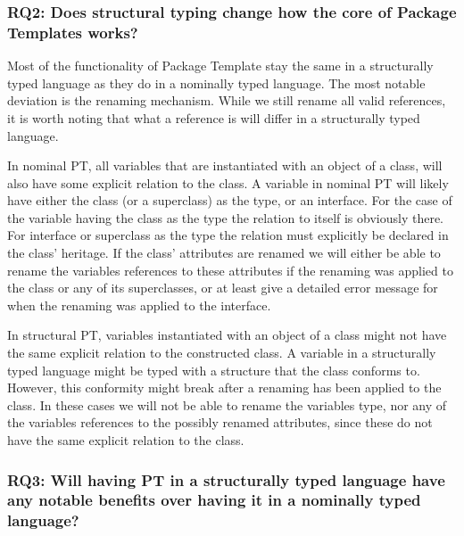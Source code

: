 \subsubsection{RQ2: Does structural typing change how the core of Package Templates works?}

Most of the functionality of Package Template stay the same in a structurally typed language as they do in a nominally typed language.
The most notable deviation is the renaming mechanism.
While we still rename all valid references, it is worth noting that what a reference is will differ in a structurally typed language.

In nominal PT, all variables that are instantiated with an object of a class, will also have some explicit relation to the class.
A variable in nominal PT will likely have either the class (or a superclass) as the type, or an interface.
For the case of the variable having the class as the type the relation to itself is obviously there.
For interface or superclass as the type the relation must explicitly be declared in the class' heritage.
If the class' attributes are renamed we will either be able to rename the variables references to these attributes if the renaming was applied to the class or any of its superclasses, or at least give a detailed error message for when the renaming was applied to the interface.

In structural PT, variables instantiated with an object of a class might not have the same explicit relation to the constructed class.
A variable in a structurally typed language might be typed with a structure that the class conforms to.
However, this conformity might break after a renaming has been applied to the class.
In these cases we will not be able to rename the variables type, nor any of the variables references to the possibly renamed attributes, since these do not have the same explicit relation to the class.

\subsubsection{RQ3: Will having PT in a structurally typed language have any notable benefits over having it in a nominally typed language?}

